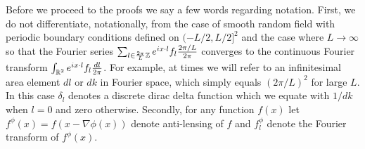 \documentclass[noinfoline]{imsart}
\begin{document}
Before we proceed to the proofs we say a few words regarding notation.
First, we do not differentiate, notationally, from the case of smooth random field with periodic boundary conditions defined on $(-L/2, L/2]^2$ and the case where $L\rightarrow \infty$ so that the Fourier series $\sum_{l \in \frac{2\pi}{L}\Bbb Z }   e^{i x\cdot l}  f_l \frac{2\pi/ L}{2\pi} $ converges to the continuous Fourier transform $\int_{\Bbb R^2}  e^{i x\cdot l}  f_l \frac{dl}{2\pi} $. %
For example, at times we will refer to an infinitesimal area element $dl$ or $dk$ in Fourier space, which simply equals $(2\pi / L)^2$ for large $L$. In this case $\delta_l$ denotes a discrete dirac delta function which we equate with $1/dk$ when $l=0$ and zero otherwise. 
Secondly, for any function $f(x)$ let $f^\phi(x) = f(x-\nabla \phi(x))$ denote anti-lensing of $f$ and $f^\phi_l$ denote the Fourier transform of  $f^\phi(x)$.
\end{document}
